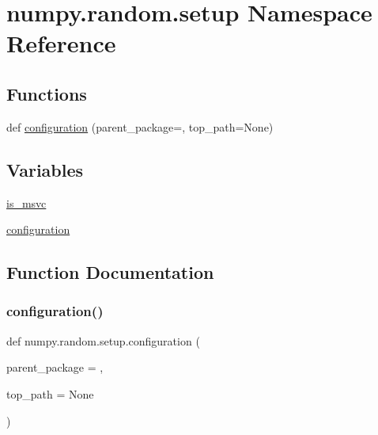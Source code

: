 \hypertarget{namespacenumpy_1_1random_1_1setup}{}\section{numpy.\+random.\+setup Namespace Reference}
\label{namespacenumpy_1_1random_1_1setup}
\subsection*{Functions}
\begin{DoxyCompactItemize}
\item 
def \hyperlink{namespacenumpy_1_1random_1_1setup_a05e88e46801deb097e1dc90cbcdbaa53}{configuration} (parent\+\_\+package=\textquotesingle{}\textquotesingle{}, top\+\_\+path=None)
\end{DoxyCompactItemize}
\subsection*{Variables}
\begin{DoxyCompactItemize}
\item 
\hyperlink{namespacenumpy_1_1random_1_1setup_a17ce3cc7d0ca13a314c81698cc7b957b}{is\+\_\+msvc}
\item 
\hyperlink{namespacenumpy_1_1random_1_1setup_ad3664c88237ac38e2f71f6d3610ad871}{configuration}
\end{DoxyCompactItemize}


\subsection{Function Documentation}
\mbox{\label{namespacenumpy_1_1random_1_1setup_a05e88e46801deb097e1dc90cbcdbaa53}} 
\subsubsection{\texorpdfstring{configuration()}{configuration()}}
{\footnotesize\ttfamily def numpy.\+random.\+setup.\+configuration (\begin{DoxyParamCaption}\item[{}]{parent\+\_\+package = {\ttfamily \textquotesingle{}\textquotesingle{}},  }\item[{}]{top\+\_\+path = {\ttfamily None} }\end{DoxyParamCaption})}



